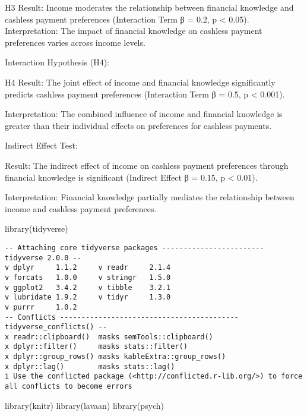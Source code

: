 \documentclass[
  super,
  preprint,
  3p]{elsarticle}
\newenvironment{Shaded}{\begin{snugshade}}{\end{snugshade}}
\newcommand{\FunctionTok}[1]{\textcolor[rgb]{0.28,0.35,0.67}{#1}}
\newcommand{\NormalTok}[1]{\textcolor[rgb]{0.00,0.23,0.31}{#1}}
\begin{document}
H3 Result: Income moderates the relationship between financial knowledge
and cashless payment preferences (Interaction Term β = 0.2, p
\textless{} 0.05). Interpretation: The impact of financial knowledge on
cashless payment preferences varies across income levels.

Interaction Hypothesis (H4):

H4 Result: The joint effect of income and financial knowledge
significantly predicts cashless payment preferences (Interaction Term β
= 0.5, p \textless{} 0.001).

Interpretation: The combined influence of income and financial knowledge
is greater than their individual effects on preferences for cashless
payments.

Indirect Effect Test:

Result: The indirect effect of income on cashless payment preferences
through financial knowledge is significant (Indirect Effect β = 0.15, p
\textless{} 0.01).

Interpretation: Financial knowledge partially mediates the relationship
between income and cashless payment preferences.

\begin{Shaded}
\begin{Highlighting}[]
\FunctionTok{library}\NormalTok{(tidyverse)}
\end{Highlighting}
\end{Shaded}

\begin{verbatim}
-- Attaching core tidyverse packages ------------------------ tidyverse 2.0.0 --
v dplyr     1.1.2     v readr     2.1.4
v forcats   1.0.0     v stringr   1.5.0
v ggplot2   3.4.2     v tibble    3.2.1
v lubridate 1.9.2     v tidyr     1.3.0
v purrr     1.0.2     
-- Conflicts ------------------------------------------ tidyverse_conflicts() --
x readr::clipboard()  masks semTools::clipboard()
x dplyr::filter()     masks stats::filter()
x dplyr::group_rows() masks kableExtra::group_rows()
x dplyr::lag()        masks stats::lag()
i Use the conflicted package (<http://conflicted.r-lib.org/>) to force all conflicts to become errors
\end{verbatim}

\begin{Shaded}
\begin{Highlighting}[]
\FunctionTok{library}\NormalTok{(knitr)}
\FunctionTok{library}\NormalTok{(lavaan)}
\FunctionTok{library}\NormalTok{(psych)}
\end{Highlighting}
\end{Shaded}
\end{document}
